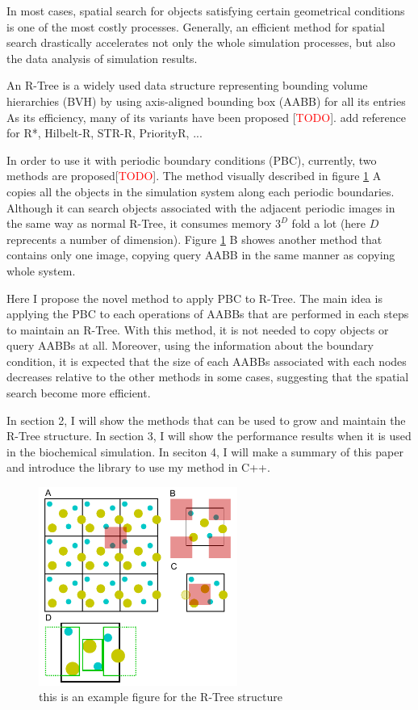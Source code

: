 \documentclass[10pt,letterpaper,twocolumn]{article}
\begin{document}
    In most cases, spatial search for objects satisfying certain geometrical
conditions is one of the most costly processes. Generally, an efficient method
for spatial search drastically accelerates not only the whole simulation
processes, but also the data analysis of simulation results.

    An R-Tree is a widely used data structure representing bounding volume
hierarchies (BVH) by using axis-aligned bounding box (AABB) for all its entries
As its efficiency, many of its variants have been proposed [\textcolor{red}{TODO}].
add reference for R*, Hilbelt-R, STR-R, PriorityR, ...

    In order to use it with periodic boundary conditions (PBC), currently,
two methods are proposed[\textcolor{red}{TODO}]. The method visually described in
figure \ref{fig1} A copies all the objects in the simulation system
along each periodic boundaries. Although it can search objects associated with
the adjacent periodic images in the same way as normal R-Tree, it consumes
memory $3^D$ fold a lot (here $D$ reprecents a number of dimension). Figure
\ref{fig1} B showes another method that contains only one image,
copying query AABB in the same manner as copying whole system.

    Here I propose the novel method to apply PBC to R-Tree. The main idea is
applying the PBC to each operations of AABBs that are performed in each steps to
maintain an R-Tree. With this method, it is not needed to copy objects or query
AABBs at all. Moreover, using the information about the boundary condition,
it is expected that the size of each AABBs associated with each nodes decreases
relative to the other methods in some cases, suggesting that the spatial search
become more efficient.

    In section 2, I will show the methods that can be used to
grow and maintain the R-Tree structure. In section 3, I will show the performance
results when it is used in the biochemical simulation. In seciton 4, I will make
a summary of this paper and introduce the library to use my method in C++.

\begin{figure}[hbt]
    \includegraphics[width=6.5cm, bb=0 0 567 567]{fig1.eps}
    \caption{this is an example figure for the R-Tree structure}
    \label{fig1}
\end{figure}
\end{document}
